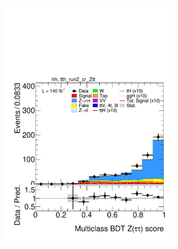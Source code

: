 \begin{figure}[htbp]
  \begin{subfigure}[b]{0.49\textwidth}
    \centering
    \includegraphics[width=\textwidth]{images/plots_modelling_run2_run3_variables/run_2_tth/plot_tth_th_multiclass_Z_hh_tth_run2_cr_Ztt_15_16_17_18.pdf}
    \caption{}
    \label{fig:overtrain_ttbar}
  \end{subfigure}
  \hfill
  \begin{subfigure}[b]{0.49\textwidth}
    \centering

\end{subfigure}
\end{figure}
